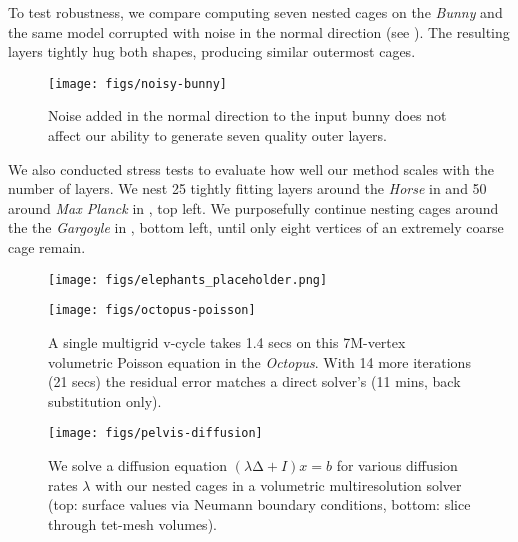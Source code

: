 To test robustness, we compare computing seven nested cages on the \emph{Bunny}
and the same model corrupted with noise in the normal direction (see
). The resulting layers tightly hug both shapes, producing
similar outermost cages.

\begin{figure}
  \texttt{[image: figs/noisy-bunny]}
  \caption{Noise added in the normal direction to the input bunny does not
  affect our ability to generate seven quality outer layers.}
  \label{fig:noisy-bunny}
\end{figure}

We also conducted stress tests to evaluate how well our method scales with the
number of layers. We nest 25 tightly fitting layers around the \emph{Horse} in
 and 50 around \emph{Max Planck} in , top
left.
%
We purposefully continue nesting cages around the the \emph{Gargoyle} in
, bottom left, until only eight vertices of an extremely coarse
cage remain.


\begin{figure}
  \texttt{[image: figs/elephants\_placeholder.png]}
  \caption{}
  \label{fig:elephants}
\end{figure}

\begin{figure}
  \texttt{[image: figs/octopus-poisson]}
  \caption{A single multigrid v-cycle takes 1.4 secs on this 7M-vertex
  volumetric Poisson equation in the \emph{Octopus}. With 14 more iterations
  (21 secs) the residual error matches a direct solver's (11 mins, back
  substitution only).}
  \label{fig:octopus-poisson}
\end{figure}
\begin{figure}
  \texttt{[image: figs/pelvis-diffusion]}
  \caption{We solve a diffusion equation $(λ∆+I) x = b$ for various diffusion
  rates $λ$ with our nested cages in a volumetric multiresolution solver (top:
  surface values via Neumann boundary conditions, bottom: slice through
  tet-mesh volumes).}
  \label{fig:pelvis-diffusion}
\end{figure}

